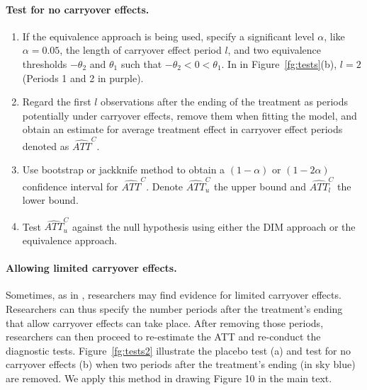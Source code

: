 \documentclass[12pt]{article}
\begin{document}
\paragraph{Test for no carryover effects.} 
\begin{enumerate}
    \item If the equivalence approach is being used, specify a significant level $\alpha$, like $\alpha = 0.05$, the length of carryover effect period $l$, and two equivalence thresholds $-\theta_2$ and $\theta_1$ such that $-\theta_2 < 0 < \theta_1$. In in Figure~\ref{fg:tests}(b), $l = 2$ (Periods 1 and 2 in purple).
    
    \item Regard the first $l$ observations after the ending of 
    the treatment as periods potentially under carryover effects, remove them when fitting the model, and obtain an estimate for average treatment 
    effect in carryover effect periods denoted as $\widehat{ATT}^C$.
    
    \item Use bootstrap or jackknife method to obtain a 
    $(1 - \alpha)$ or $(1 - 2\alpha)$ confidence interval for $\widehat{ATT}^C$. Denote 
    $\widehat{ATT}^C_u$ the upper bound and 
    $\widehat{ATT}^C_l$ the lower bound.

    \item Test $\widehat{ATT}^C_u$ against the null hypothesis using either the DIM approach or the equivalence approach.  
\end{enumerate}



\paragraph{Allowing limited carryover effects.} Sometimes, as in \citet{FM2015-yy}, researchers may find evidence for limited carryover effects. Researchers can thus specify the number periods after the treatment's ending that allow carryover effects can take place. After removing those periods, researchers can then proceed to re-estimate the ATT and re-conduct the diagnostic tests. Figure~\ref{fg:tests2} illustrate the placebo test (a) and test for no carryover effects (b) when two periods after the treatment's ending (in sky blue) are removed. We apply this method in drawing Figure 10 in the main text. 
\end{document}
